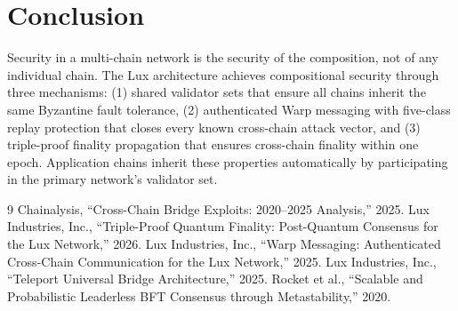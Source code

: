 \section{Conclusion}


Security in a multi-chain network is the security of the composition, not of any individual chain. The Lux architecture achieves compositional security through three mechanisms: (1) shared validator sets that ensure all chains inherit the same Byzantine fault tolerance, (2) authenticated Warp messaging with five-class replay protection that closes every known cross-chain attack vector, and (3) triple-proof finality propagation that ensures cross-chain finality within one epoch. Application chains inherit these properties automatically by participating in the primary network's validator set.

\begin{thebibliography}{9}
 Chainalysis, ``Cross-Chain Bridge Exploits: 2020--2025 Analysis,'' 2025.
 Lux Industries, Inc., ``Triple-Proof Quantum Finality: Post-Quantum Consensus for the Lux Network,'' 2026.
 Lux Industries, Inc., ``Warp Messaging: Authenticated Cross-Chain Communication for the Lux Network,'' 2025.
 Lux Industries, Inc., ``Teleport Universal Bridge Architecture,'' 2025.
 Rocket et al., ``Scalable and Probabilistic Leaderless BFT Consensus through Metastability,'' 2020.
\end{thebibliography}

